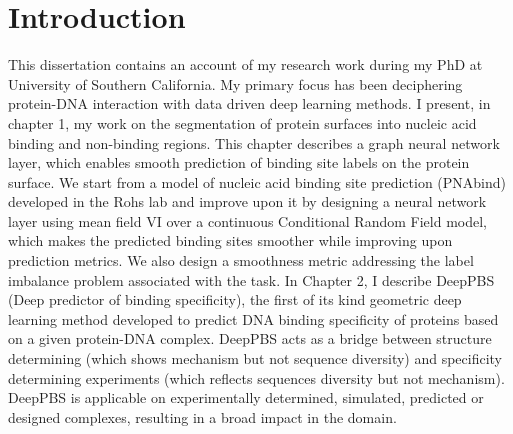 \section*{Introduction}
This dissertation contains an account of my research work during my PhD at University of Southern California.
My primary focus has been deciphering protein-DNA interaction with data driven deep learning methods. I present, in chapter 1,
my work on the segmentation of protein surfaces into nucleic acid binding and non-binding regions. This chapter describes a graph neural network layer, which enables smooth prediction of binding site labels on the protein surface. We start from a model of nucleic acid binding site
prediction (PNAbind) developed in the Rohs lab and improve upon it by designing a neural network layer using mean field
VI over a continuous Conditional Random Field model, which makes the predicted binding sites smoother while improving upon prediction metrics. We also design a smoothness metric
addressing the label imbalance problem associated with the task.
In Chapter 2, I describe DeepPBS (Deep predictor of binding specificity), the first of its kind geometric deep learning method developed to predict DNA binding specificity of proteins based on a given protein-DNA complex. DeepPBS acts as a bridge between structure determining (which shows mechanism but not sequence diversity) and specificity determining experiments (which reflects sequences diversity but not mechanism). DeepPBS is applicable on experimentally determined, simulated, predicted or designed complexes, resulting in a broad impact in the domain.

